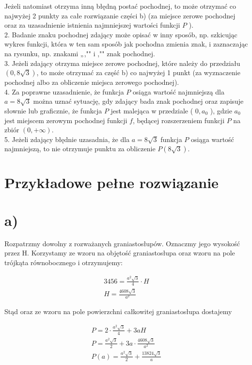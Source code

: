 \documentclass[10pt]{article}
\begin{document}
Jeżeli natomiast otrzyma inną błędną postać pochodnej, to może otrzymać co najwyżej 2 punkty za całe rozwiązanie części b) (za miejsce zerowe pochodnej oraz za uzasadnienie istnienia najmniejszej wartości funkcji $P$ ).\\
2. Badanie znaku pochodnej zdający może opisać w inny sposób, np. szkicując wykres funkcji, która w ten sam sposób jak pochodna zmienia znak, i zaznaczając na rysunku, np. znakami „,"" i ,"" znak pochodnej.\\
3. Jeżeli zdający otrzyma miejsce zerowe pochodnej, które należy do przedziału $(0,8 \sqrt{3})$, to może otrzymać za część b) co najwyżej 1 punkt (za wyznaczenie pochodnej albo za obliczenie miejsca zerowego pochodnej).\\
4. Za poprawne uzasadnienie, że funkcja $P$ osiąga wartość najmniejszą dla $a=8 \sqrt{3}$ można uznać sytuację, gdy zdający bada znak pochodnej oraz zapisuje słownie lub graficznie, że funkcja $P$ jest malejąca w przedziale ( $0, a_{0}$ ), gdzie $a_{0}$ jest miejscem zerowym pochodnej funkcji $f$, będącej rozszerzeniem funkcji $P$ na zbiór $(0,+\infty)$.\\
5. Jeżeli zdający błędnie uzasadnia, że dla $a=8 \sqrt{3}$ funkcja $P$ osiąga wartość najmniejszą, to nie otrzymuje punktu za obliczenie $P(8 \sqrt{3})$.

\section*{Przykładowe pełne rozwiązanie}
\section*{a)}
Rozpatrzmy dowolny z rozważanych graniastosłupów. Oznaczmy jego wysokość przez H. Korzystamy ze wzoru na objętość graniastosłupa oraz wzoru na pole trójkąta równobocznego i otrzymujemy:

$$
\begin{gathered}
3456=\frac{a^{2} \sqrt{3}}{4} \cdot H \\
H=\frac{4608 \sqrt{3}}{a^{2}}
\end{gathered}
$$

Stąd oraz ze wzoru na pole powierzchni całkowitej graniastosłupa dostajemy

$$
\begin{gathered}
P=2 \cdot \frac{a^{2} \sqrt{3}}{4}+3 a H \\
P=\frac{a^{2} \sqrt{3}}{2}+3 a \cdot \frac{4608 \sqrt{3}}{a^{2}} \\
P(a)=\frac{a^{2} \sqrt{3}}{2}+\frac{13824 \sqrt{3}}{a}
\end{gathered}
$$
\end{document}
